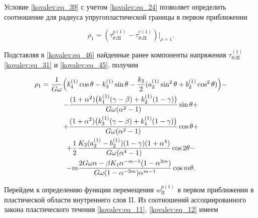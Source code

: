 Условие \eqref{kovalev:eq_39} с учетом \eqref{kovalev:eq_24} позволяет определить соотношение для радиуса упругопластической границы в первом приближении

 \begin{equation}

\label{kovalev:eq_46}

  \rho_1=(\tau_{\theta z\mathrm{II}}^{p(1)}-\tau_{\theta z\mathrm{II}}^{e(1)})\bigr|_{\rho=1}.

 \end{equation}

Подставляя в \eqref{kovalev:eq_46} найденные ранее компоненты напряжения $\tau_{\theta z\mathrm{II}}^{(1)}$ \eqref{kovalev:eq_31} и \eqref{kovalev:eq_45}, получим

 \begin{multline}

\label{kovalev:eq_47}

  \rho_1=\dfrac1{G\omega}\Bigl(k_4^{(1)}\cos\theta-k_3^{(1)}\sin\theta-\frac{k_2}{2}

  (a_2^{(1)}\sin^2\theta+b_2^{(1)}\cos^2\theta)\Bigr)-

  \\

  -\frac{(1+\alpha^2)\bigl(k_1^{(1)}(\gamma-\beta)+k_2^{(1)}(1-\gamma)\bigr)}{G\omega(\alpha^2-1)}\sin\theta+\\

  +\frac{(1+\alpha^2)\bigl(k_3^{(1)}(\gamma-\beta)+k_4^{(1)}(1-\gamma)\bigr)}{G\omega(\alpha^2-1)}\cos\theta+\\

  +\frac12\frac{K_2(a_2^{(1)}-b_2^{(1)})(1-\gamma)(1+\alpha^4)}{G\omega(\alpha^4-1)}\cos2\theta-\\

  -m\frac{2G\omega\alpha-\beta K_1\alpha^{-m-1}(1-\alpha^{2m})}{G\omega(1-\alpha^{-2m})\alpha^{m-1}}\cos m\theta.

 \end{multline}



Перейдем к определению функции перемещения  $w_{\mathrm{II}}^{p(1)}$ в первом приближении в пластической области внутреннего слоя II. Из соотношений ассоциированного закона пластического течения \eqref{kovalev:eq_11}, \eqref{kovalev:eq_12} имеем

